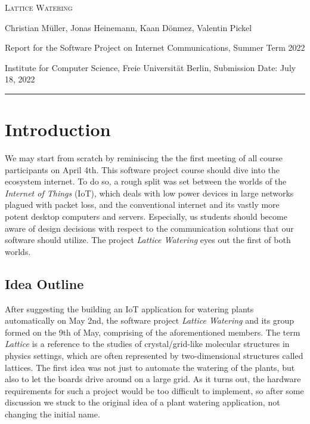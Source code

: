 \documentclass[10pt, a4paper]{article}
\begin{document}
    \begin{center}
        \large \textsc{Lattice Watering}

        \vspace{0.15cm}

        Christian Müller, Jonas Heinemann, Kaan Dönmez, Valentin Pickel

        \vspace{0.15cm}

        Report for the Software Project on Internet Communications, Summer Term 2022

        Institute for Computer Science, Freie Universität Berlin, Submission Date: July 18, 2022

        \vspace*{\baselineskip}

        \rule[0.5\baselineskip]{\linewidth}{0.5pt}
    \end{center}

    \section{Introduction}

    We may start from scratch by reminiscing the the first meeting of all course participants on April 4th. This software project course should dive into the ecosystem internet. To do so, a rough split was set between the worlds of the \emph{Internet of Things} (IoT), which deals with low power devices in large networks plagued with packet loss, and the conventional internet and its vastly more potent desktop computers and servers. Especially, us students should become aware of design decisions with respect to the communication solutions that our software should utilize. The project \emph{Lattice Watering} eyes out the first of both worlds.

    \subsection{Idea Outline}

    After suggesting the building an IoT application for watering plants automatically on May 2nd, the software project \emph{Lattice Watering} and its group formed on the 9th of May, comprising of the aforementioned members. The term \emph{Lattice} is a reference to the studies of crystal/grid-like molecular structures in physics settings, which are often represented by two-dimensional structures called lattices. The first idea was not just to automate the watering of the plants, but also to let the boards drive around on a large grid. As it turns out, the hardware requirements for such a project would be too difficult to implement, so after some discussion we stuck to the original idea of a plant watering application, not changing the initial name.
\end{document}
